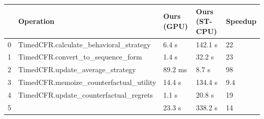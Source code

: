 \begin{tabular}{lllll}
\toprule
 & Operation & Ours (GPU) & Ours (ST-CPU) & Speedup \\
\midrule
0 & TimedCFR.calculate_behavioral_strategy & 6.4 s & 142.1 s & 22 \\
1 & TimedCFR.convert_to_sequence_form & 1.4 s & 32.2 s & 23 \\
2 & TimedCFR.update_average_strategy & 89.2 ms & 8.7 s & 98 \\
3 & TimedCFR.memoize_counterfactual_utility & 14.4 s & 134.4 s & 9.4 \\
4 & TimedCFR.update_counterfactual_regrets & 1.1 s & 20.8 s & 19 \\
5 &  & 23.3 s & 338.2 s & 14 \\
\bottomrule
\end{tabular}
